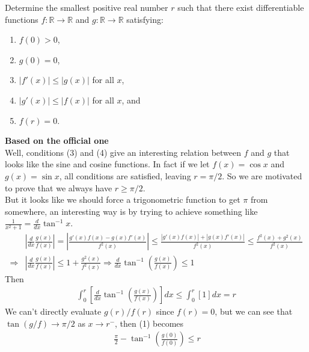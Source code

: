 \begin{problem}[D][9][Putnam 2023 A3]
     Determine the smallest positive real number $r$ such that there exist differentiable functions $f : \mathbb{R} \to \mathbb{R}$ and $g : \mathbb{R} \to \mathbb{R}$ satisfying:
    \begin{enumerate}
        \item $f(0) > 0$,
        \item $g(0) = 0$,
        \item $|f'(x)| \leq |g(x)|$ for all $x$,
        \item $|g'(x)| \leq |f(x)|$ for all $x$, and
        \item $f(r) = 0$.
    \end{enumerate}
\end{problem}

\begin{solution}[$\pi/2$]
    \textbf{Based on the official one}\\
   Well, conditions (3) and (4) give an interesting relation between $f$ and $g$ that looks like the sine and cosine functions. In fact if we let $f(x)=\cos x$ and $g(x) = \sin x$, all conditions are satisfied, leaving $r=\pi /2$. So we are motivated to prove that we always have $r \geq \pi / 2$.\\
   But it looks like we should force a trigonometric function to get $\pi$ from somewhere, an interesting way is by trying to achieve something like $\frac{1}{x^2+1}=\frac{d}{dx}\tan^{-1}x$.\\ \vspace{5pt}
   \begin{align*}
        &\left | \frac{d}{dx} \frac{g(x)}{f(x)} \right |= \left |\frac{g'(x)f(x)-   g(x)f'(x)}{f^2(x)}\right | \leq \frac{|g'(x)f(x)|+|g(x)f'(x)|}{f^2(x)} \leq \frac{f^2(x)+g^2(x)}{f^2(x)} \\
        \Rightarrow &\left | \frac{d}{dx} \frac{g(x)}{f(x)} \right | \leq 1+\frac{g^2(x)}{f^2(x)} \Rightarrow \frac{d}{dx}\tan^{-1} \left( \frac{g(x)}{f(x)} \right ) \leq 1
    \end{align*}
    Then 
    \begin{align}
        \int_0^r \left[\frac{d}{dx}\tan^{-1} \left( \frac{g(x)}{f(x)} \right )\right]dx \leq \int_0^r [1] dx = r
    \end{align}
    We can't directly evaluate $g(r)/f(r)$ since $f(r)=0$, but we can see that $\tan (g/f) \rightarrow \pi/2$ as $x \rightarrow r^-$, then (1) becomes
    \begin{align*}
        \ \frac{\pi}{2} - \tan^{-1} \left( \frac{g(0)}{f(0)} \right ) \leq r \\

\end{align*}
\end{solution}
